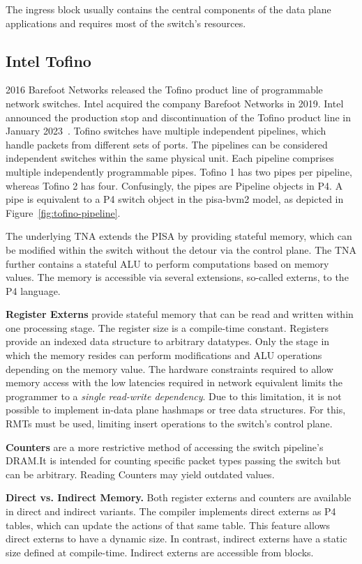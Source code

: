 The ingress block usually contains the central components of the data plane applications and requires most of the switch's resources.


\subsection{Intel Tofino}
2016 Barefoot Networks released the Tofino product line of programmable network switches. Intel acquired the company Barefoot Networks in 2019. Intel announced the production stop and discontinuation of the Tofino product line in January 2023~\cite{maxa.cherneyIntelHaltsTofino}\@. Tofino switches have multiple independent pipelines, which handle packets from different sets of ports. The pipelines can be considered independent switches within the same physical unit. Each pipeline comprises multiple independently programmable pipes. Tofino 1 has two pipes per pipeline, whereas Tofino 2 has four. Confusingly, the pipes are Pipeline objects in P4. A pipe is equivalent to a P4 switch object in the pisa-bvm2 model, as depicted in Figure~\ref{fig:tofino-pipeline}.

The underlying \ac{TNA} extends the \ac{PISA} by providing stateful memory, which can be modified within the switch without the detour via the control plane. The \ac{TNA} further contains a stateful \ac{ALU} to perform computations based on memory values. The memory is accessible via several extensions, so-called externs, to the P4 language.

\textbf{Register Externs} provide stateful memory that can be read and written within one processing stage. The register size is a compile-time constant. Registers provide an indexed data structure to arbitrary datatypes. Only the stage in which the memory resides can perform modifications and \ac{ALU} operations depending on the memory value. The hardware constraints required to allow memory access with the low latencies required in network equivalent limits the programmer to a \emph{single read-write dependency}. Due to this limitation, it is not possible to implement in-data plane hashmaps or tree data structures. For this, \acp{RMT} must be used, limiting insert operations to the switch's control plane.

\textbf{Counters} are a more restrictive method of accessing the switch pipeline's DRAM.\@ It is intended for counting specific packet types passing the switch but can be arbitrary. Reading Counters may yield outdated values.

\textbf{Direct vs. Indirect Memory.}
Both register externs and counters are available in direct and indirect variants. The compiler implements direct externs as P4 tables, which can update the actions of that same table. This feature allows direct externs to have a dynamic size. In contrast, indirect externs have a static size defined at compile-time. Indirect externs are accessible from  blocks.

